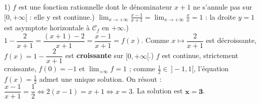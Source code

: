 1) $f$ est une fonction rationnelle dont le dénominateur $x+1$ ne s'annule pas sur $[0,+\infty[$ : elle y est continue.) $\displaystyle\lim_{x\to+\infty}\frac{x-1}{x+1}=\lim_{x\to+\infty}\frac{x}{x}=1$ : la droite $y=1$ est asymptote horizontale à $\mathcal C_f$ en $+\infty$.) $1-\dfrac{2}{x+1}=\dfrac{(x+1)-2}{x+1}=\dfrac{x-1}{x+1}=f(x)$. Comme $x\mapsto\dfrac{2}{x+1}$ est décroissante, $f(x)=1-\dfrac{2}{x+1}$ est \textbf{croissante} sur $[0,+\infty[$.) $f$ est continue, strictement croissante, $f(0)=-1$ et $\displaystyle\lim_{+\infty}f=1$ ; comme $\frac12\in\,]-1,1[$, l'équation $f(x)=\frac12$ admet une unique solution. On résout : $\dfrac{x-1}{x+1}=\dfrac12\Leftrightarrow 2(x-1)=x+1\Leftrightarrow x=3$. La solution est $\mathbf{x=3}$.
